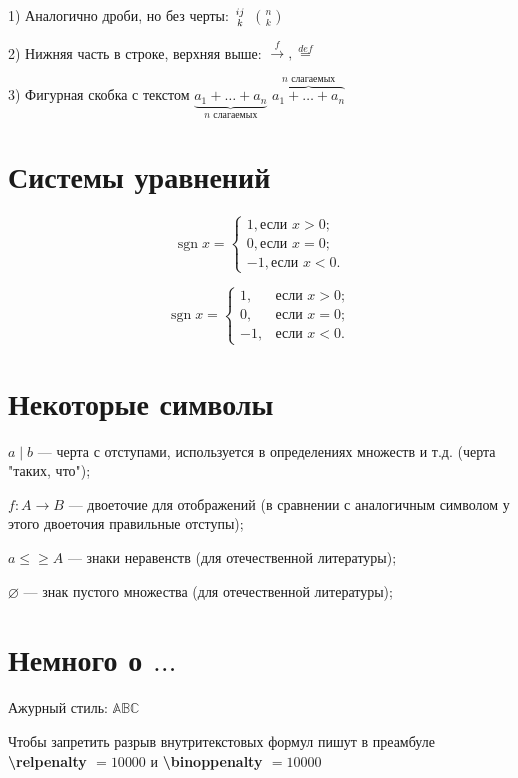 \documentclass[a4paper,12pt]{article}
\newcommand{\sgn}{\mathop{\mathrm{sgn}}\nolimits}
\begin{document}
1) Аналогично дроби, но без черты: $ij\atop k$ $n \choose k$

2) Нижняя часть в строке, верхняя выше: $\stackrel{f}{\longrightarrow}, \stackrel{def}{=}$

3) Фигурная скобка с текстом $\underbrace{a_1+\ldots+a_n}_{n \text{ слагаемых}}$ $\overbrace{a_1+\ldots+a_n}^{n \text{ слагаемых}}$



\section{Системы уравнений}
 
$$
\sgn x= \begin{cases} %
	1, \text{если } x>0;\\
	0, \text{если } x=0;\\
	-1, \text{если } x<0.
\end{cases}
$$

$$
\sgn x= \begin{cases} %
	1, &\text{если } x>0;\\
	0, &\text{если } x=0;\\
	-1, &\text{если } x<0.
\end{cases}
$$

\section{Некоторые символы}

$a \mid b$ --- черта с отступами, используется в определениях множеств и т.д. (черта "таких, что");

$f \colon A \to B$ --- двоеточие для отображений (в сравнении с аналогичным символом у этого двоеточия правильные отступы);

$a \leqslant \geqslant A $ --- знаки неравенств (для отечественной литературы);

$ \varnothing $ --- знак пустого множества (для отечественной литературы);

\section{Немного о $\ldots$}

Ажурный стиль: $\mathbb{ABC}$

Чтобы запретить разрыв внутритекстовых формул пишут в преамбуле \textbf{\textbackslash relpenalty $ = 10 000$} и \textbf{\textbackslash binoppenalty $= 10 000$}
\end{document}
